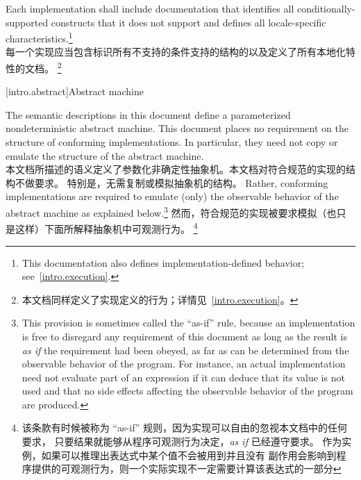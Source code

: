 \pnum
Each implementation shall include documentation that identifies all
conditionally-supported constructs
that it does not support and defines all locale-specific characteristics.\footnote{This documentation also defines implementation-defined behavior;
see~\ref{intro.execution}.} \\
每一个实现应当包含标识所有不支持的条件支持的结构的以及定义了所有本地化特性的文档。
\footnote{本文档同样定义了实现定义的行为；详情见~\ref{intro.execution}。}
%
%

[intro.abstract]{Abstract machine}

\pnum
{}%
%
The semantic descriptions in this document define a
parameterized nondeterministic abstract machine. This document
places no requirement on the structure of conforming
implementations. In particular, they need not copy or emulate the
structure of the abstract machine. \\
本文档所描述的语义定义了参数化非确定性抽象机。本文档对符合规范的实现的结构不做要求。
特别是，无需复制或模拟抽象机的结构。
%
%
Rather, conforming implementations are required to emulate (only) the observable
behavior of the abstract machine as explained below.\footnote{This provision is
sometimes called the ``as-if'' rule, because an implementation is free to
disregard any requirement of this document as long as the result
is \emph{as if} the requirement had been obeyed, as far as can be determined
from the observable behavior of the program. For instance, an actual
implementation need not evaluate part of an expression if it can deduce that its
value is not used and that no
%
side effects affecting the
observable behavior of the program are produced.}
然而，符合规范的实现被要求模拟（也只是这样）下面所解释抽象机中可观测行为。
\footnote{该条款有时候被称为 ``as-if'' 规则，因为实现可以自由的忽视本文档中的任何要求，
只要结果就能够从程序可观测行为决定，\emph{as if} 已经遵守要求。
作为实例，如果可以推理出表达式中某个值不会被用到并且没有 %
副作用会影响到程序提供的可观测行为，则一个实际实现不一定需要计算该表达式的一部分}

